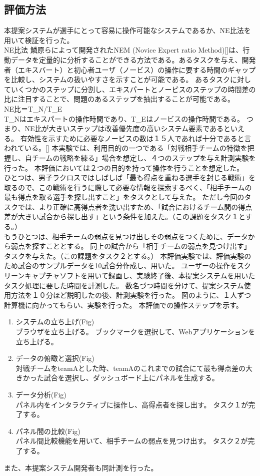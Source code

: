 \documentclass[sotsuron]{kuee}
\begin{document}
		\subsection{評価方法}
			本提案システムが選手にとって容易に操作可能なシステムであるか、NE比法を用いて検証を行った。
			\\NE比法
			鱗原らによって開発されたNEM (Novice Expert ratio Method)[]は、行動データを定量的に分析することができる方法である。あるタスクを与え、開発者（エキスバート）と初心者ユーザ（ノービス）の操作に要する時間のギャップを比較し、システムの扱いやすさを示すことが可能である。
			あるタスクに対していくつかのステップに分割し、エキスパートとノービスのステップの時間差の比に注目することで、問題のあるステップを抽出することが可能である。
			\\NE比＝T\_N/T\_E
			\\ T\_Nはエキスパートの操作時間であり、T\_Eはノービスの操作時間である。
			つまり、NE比が大きいステップは改善優先度の高いシステム要素であるといえる。
			有効性を示すために必要なノービスの数は１５人であれば十分であると言われている。[]
			本実験では、利用目的の一つである「対戦相手チームの特徴を把握し、自チームの戦略を練る」場合を想定し、４つのステップを与え計測実験を行った。
			本評価においては２つの目的を持って操作を行うことを想定した。
			\\ひとつは、男子ラクロスではしばしば「最も得点を重ねる選手を封じる戦術」を取るので、この戦術を行うに際して必要な情報を探索するべく、「相手チームの最も得点を取る選手を探し出すこと」をタスクとして与えた。
			ただし今回のタスクでは、より正確に高得点者を洗い出すため、「試合におけるチーム間の得点差が大きい試合から探し出す」という条件を加えた。（この課題をタスク１とする。）
			\\もうひとつは、相手チームの弱点を見つけ出しその弱点をつくために、データから弱点を探すこととする。
			同上の試合から「相手チームの弱点を見つけ出す」タスクを与えた。（この課題をタスク２とする。）
			本評価実験では、評価実験のため試合のサンプルデータを10試合分作成し、用いた。
			ユーザーの操作をスクリーンキャプチャソフトを用いて録画し、実験終了後、本提案システムを用いたタスク処理に要した時間を計測した。
			数名づつ時間を分けて、提案システム使用方法を１０分ほど説明したの後、計測実験を行った。
			図のように、１人ずつ計算機に向かってもらい、実験を行った。
			本評価での操作ステップを示す。
			\begin{enumerate}
				\item システムの立ち上げ(Fig)
				\\ブラウザを立ち上げる。
				ブックマークを選択して、Webアプリケーションを立ち上げる。
				\item データの俯瞰と選択(Fig)
				\\対戦チームをteamAとした時、teamAのこれまでの試合にて最も得点差の大きかった試合を選択し、ダッシュボード上にパネルを生成する。
				\item データ分析(Fig)
				\\パネル内をインタラクティブに操作し、高得点者を探し出す。
				タスク１が完了する。
				\item パネル間の比較(Fig)
				\\パネル間比較機能を用いて、相手チームの弱点を見つけ出す。
				タスク２が完了する。
			\end{enumerate}
			また、本提案システム開発者も同計測を行った。
\end{document}
